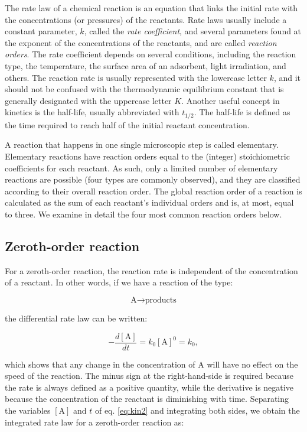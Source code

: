 \documentclass[
  9pt,
]{extbook}
\theoremstyle{definition}
\theoremstyle{definition}
\theoremstyle{definition}
\theoremstyle{definition}
\theoremstyle{remark}
\begin{document}
The rate law of a chemical reaction is an equation that links the initial rate with the concentrations (or pressures) of the reactants. Rate laws usually include a constant parameter, \(k\), called the \emph{rate coefficient}, and several parameters found at the exponent of the concentrations of the reactants, and are called \emph{reaction orders}. The rate coefficient depends on several conditions, including the reaction type, the temperature, the surface area of an adsorbent, light irradiation, and others. The reaction rate is usually represented with the lowercase letter \(k\), and it should not be confused with the thermodynamic equilibrium constant that is generally designated with the uppercase letter \(K\). Another useful concept in kinetics is the half-life, usually abbreviated with \(t_{1/2}\). The half-life is defined as the time required to reach half of the initial reactant concentration.

A reaction that happens in one single microscopic step is called elementary. Elementary reactions have reaction orders equal to the (integer) stoichiometric coefficients for each reactant. As such, only a limited number of elementary reactions are possible (four types are commonly observed), and they are classified according to their overall reaction order. The global reaction order of a reaction is calculated as the sum of each reactant's individual orders and is, at most, equal to three. We examine in detail the four most common reaction orders below.

\subsection{Zeroth-order reaction}\label{zeroth-order-reaction}

For a zeroth-order reaction, the reaction rate is independent of the concentration of a reactant. In other words, if we have a reaction of the type:

\begin{equation}
\text{A}\longrightarrow\text{products}
\end{equation}

the differential rate law can be written:

\begin{equation}
- \frac{d[\mathrm{A}]}{dt}=k_0 [\mathrm{A}]^0 = k_0,
\label{eq:kin2}
\end{equation}

which shows that any change in the concentration of \(\mathrm{A}\) will have no effect on the speed of the reaction. The minus sign at the right-hand-side is required because the rate is always defined as a positive quantity, while the derivative is negative because the concentration of the reactant is diminishing with time.
Separating the variables \([\mathrm{A}]\) and \(t\) of eq. \eqref{eq:kin2} and integrating both sides, we obtain the integrated rate law for a zeroth-order reaction as:
\end{document}
